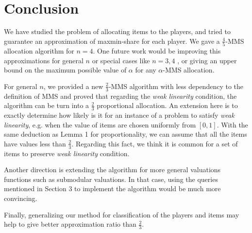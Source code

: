 \section{Conclusion}
We have studied the problem of allocating items to the players, and tried to guarantee an approximation of maxmin-share for each player. We gave a $\frac{4}{5}$-MMS allocation algorithm for $n=4$. One future work would be improving this approximations for general $n$ or special cases like $n=3,4$ , or giving an upper bound on the maximum possible value of $\alpha$ for any $\alpha$-MMS allocation. 

For general $n$, we provided a new $\frac{2}{3}$-MMS algorithm with less dependency to the definition of MMS and proved that regarding the \emph{weak linearity} condition, the algorithm can be turn into a $\frac{2}{3}$ proportional allocation. An extension here is to exactly determine how likely is it for an instance of a problem to satisfy \emph{weak linearity}, e.g. when the value of items are chosen uniformly from $[0,1]$. With the same deduction as Lemma 1 for proportionality, we can assume that all the items have values less than $\frac{2}{3}$. Regarding this fact, we think it is common for a set of items to preserve \emph{weak linearity} condition.

Another direction is extending the algorithm for more general valuations functions such as submodular valuations. In that case, using the queries mentioned in Section 3 to implement the algorithm would be much more convincing.

Finally, generalizing our method for classification of the players and items may help to give better approximation ratio than $\frac{2}{3}$. 
